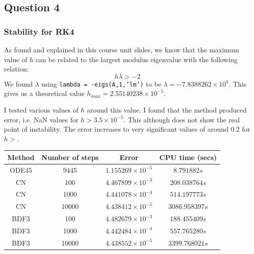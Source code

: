 \documentclass[a4paper, 11pt]{article}
\begin{document}
	
	\subsection*{Question 4}
		\subsubsection*{Stability for RK4}
			As found and explained in this course unit slides, we know that the maximum value of $ h $ can be related to the largest modulus eigenvalue with the following relation:
			\begin{equation}
				h\lambda > -2
			\end{equation}
			We found $ \lambda $ using \texttt{lambda = -eigs(A,1,’lm’)} to be $ \lambda = -7.8388262\times 10^{4} $.
			This gives us a theoretical value $h_{max} = 2.55140238\times 10^{-5} $. 
			
			I tested various values of $h$ around this value. 
			I found that the method produced error, i.e. NaN values for $h > 3.5\times 10^{-5} $.
			This although does not show the real point of instability.
			The error increases to very significant values of around $ 0.2 $ for  $h> $.
			
			
			
	
	\begin{table}[H]
		\centering
		\begin{tabular}{c|c|c|c}
			\textbf{Method} & \textbf{Number of steps} 	& \textbf{Error}  				& \textbf{CPU time (secs)}  	\\ \hline
			ODE45 			& 9445 						& $ 1.155269\times 10^{-5} $ 	& $ 8.791882 s $ 	\\ \hline 
			CN 				& 100 						& $ 4.467899\times 10^{-3} $ 	& $ 208.038764 s $ 				\\ \hline
			CN 				& 1000 						& $ 4.441078\times 10^{-4} $ 	& $ 514.197773 s $ 				\\ \hline
			CN 				& 10000 					& $ 4.438412\times 10^{-5} $ 	& $ 3086.958397 s $				\\ \hline
			BDF3 			& 100				 		& $ 4.482679\times 10^{-3} $ 	& $ 188.455409 s $ 				\\ \hline
			BDF3 			& 1000						& $ 4.442484\times 10^{-4} $ 	& $ 557.765280 s $ 				\\ \hline
			BDF3 			& 10000 					& $ 4.438552\times 10^{-5} $ 	& $ 3399.768021 s $ 			\\ \hline
		\end{tabular}
	\end{table}
\end{document}
